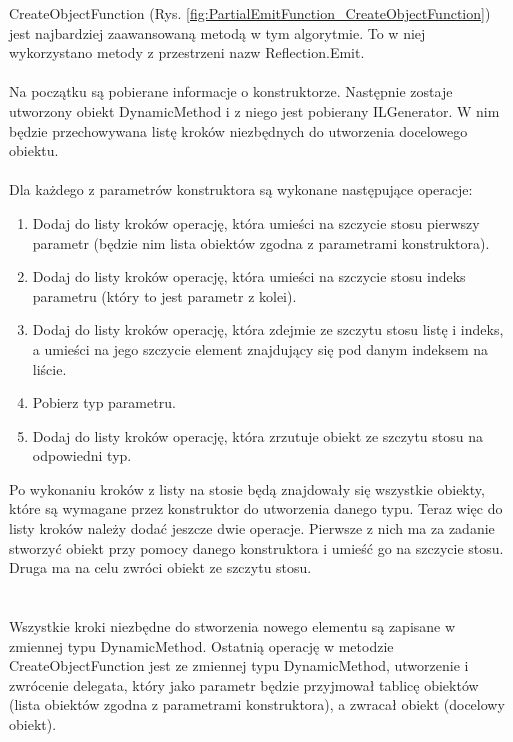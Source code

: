 \documentclass[12pt]{article}
\begin{document}
CreateObjectFunction (Rys. \ref{fig:PartialEmitFunction_CreateObjectFunction}) jest najbardziej zaawansowaną metodą w tym algorytmie. To w niej wykorzystano metody z przestrzeni nazw Reflection.Emit.\\
\\
Na początku są pobierane informacje o konstruktorze. Następnie zostaje utworzony obiekt DynamicMethod i z niego jest pobierany ILGenerator. W nim będzie przechowywana listę kroków niezbędnych do utworzenia docelowego obiektu.\\
\\
Dla każdego z parametrów konstruktora są wykonane następujące operacje:
\begin{enumerate}
	\item Dodaj do listy kroków operację, która umieści na szczycie stosu pierwszy parametr (będzie nim lista obiektów zgodna z parametrami konstruktora).
	\item Dodaj do listy kroków operację, która umieści na szczycie stosu indeks parametru (który to jest parametr z kolei).
	\item Dodaj do listy kroków operację, która zdejmie ze szczytu stosu listę i indeks, a umieści na jego szczycie element znajdujący się pod danym indeksem na liście.
	\item Pobierz typ parametru.
	\item Dodaj do listy kroków operację, która zrzutuje obiekt ze szczytu stosu na odpowiedni typ.
\end{enumerate}
Po wykonaniu kroków z listy na stosie będą znajdowały się wszystkie obiekty, które są wymagane przez konstruktor do utworzenia danego typu. Teraz więc do listy kroków należy dodać jeszcze dwie operacje. Pierwsze z nich ma za zadanie stworzyć obiekt przy pomocy danego konstruktora i umieść go na szczycie stosu. Druga ma na celu zwróci obiekt ze szczytu stosu.\\
\\ \\
Wszystkie kroki niezbędne do stworzenia nowego elementu są zapisane w zmiennej typu DynamicMethod. Ostatnią operację w metodzie CreateObjectFunction jest ze zmiennej typu DynamicMethod, utworzenie i zwrócenie delegata, który jako parametr będzie przyjmował tablicę obiektów (lista obiektów zgodna z parametrami konstruktora), a zwracał obiekt (docelowy obiekt).\\ \\
\end{document}
